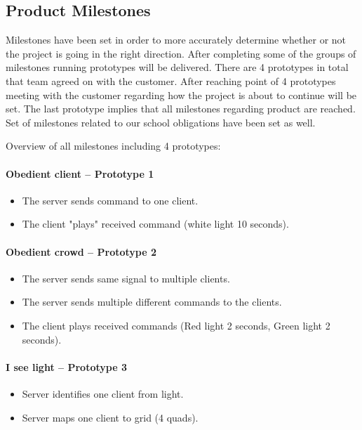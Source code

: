 \subsection{Product Milestones}

Milestones have been set in order to more accurately determine whether or not the project is going in the right direction.
After completing some of the groups of milestones running prototypes will be delivered. 
There are 4 prototypes in total that team agreed on with the customer. 
After reaching point of 4 prototypes meeting with the customer regarding how the project is about to continue will be set. 
The last prototype implies that all milestones regarding product are reached. 
Set of milestones related to our school obligations have been set as well.

 
Overview of all milestones including 4 prototypes:

\paragraph{Obedient client  -- Prototype 1}
\begin{itemize}
	\item The server sends command to one client.
	\item The client "plays" received command (white light 10 seconds).
\end{itemize}

\paragraph{Obedient crowd -- Prototype 2}
\begin{itemize}
	\item The server sends same signal to multiple clients.
	\item The server sends multiple different commands to the clients.
	\item The client plays received commands (Red light 2 seconds, Green light 2 seconds).
\end{itemize}

\paragraph{I see light -- Prototype 3}
\begin{itemize}
	\item Server identifies one client from light.
	\item Server maps one client to grid (4 quads).
\end{itemize}

